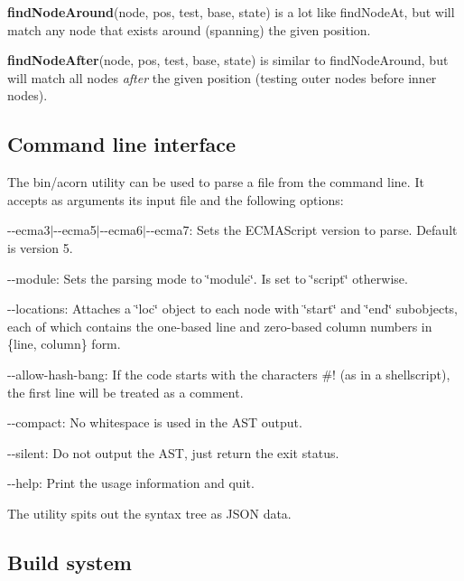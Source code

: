 {\bfseries find\+Node\+Around}{\ttfamily (node, pos, test, base, state)} is a lot like {\ttfamily find\+Node\+At}, but will match any node that exists \textquotesingle{}around\textquotesingle{} (spanning) the given position.

{\bfseries find\+Node\+After}{\ttfamily (node, pos, test, base, state)} is similar to {\ttfamily find\+Node\+Around}, but will match all nodes {\itshape after} the given position (testing outer nodes before inner nodes).

\subsection*{Command line interface}

The {\ttfamily bin/acorn} utility can be used to parse a file from the command line. It accepts as arguments its input file and the following options\+:


\begin{DoxyItemize}
\item {\ttfamily -\/-\/ecma3$\vert$-\/-\/ecma5$\vert$-\/-\/ecma6$\vert$-\/-\/ecma7}\+: Sets the E\+C\+M\+A\+Script version to parse. Default is version 5.
\item {\ttfamily -\/-\/module}\+: Sets the parsing mode to {\ttfamily \char`\"{}module\char`\"{}}. Is set to {\ttfamily \char`\"{}script\char`\"{}} otherwise.
\item {\ttfamily -\/-\/locations}\+: Attaches a \char`\"{}loc\char`\"{} object to each node with \char`\"{}start\char`\"{} and \char`\"{}end\char`\"{} subobjects, each of which contains the one-\/based line and zero-\/based column numbers in {\ttfamily \{line, column\}} form.
\item {\ttfamily -\/-\/allow-\/hash-\/bang}\+: If the code starts with the characters \#! (as in a shellscript), the first line will be treated as a comment.
\item {\ttfamily -\/-\/compact}\+: No whitespace is used in the A\+ST output.
\item {\ttfamily -\/-\/silent}\+: Do not output the A\+ST, just return the exit status.
\item {\ttfamily -\/-\/help}\+: Print the usage information and quit.
\end{DoxyItemize}

The utility spits out the syntax tree as J\+S\+ON data.

\subsection*{Build system}


